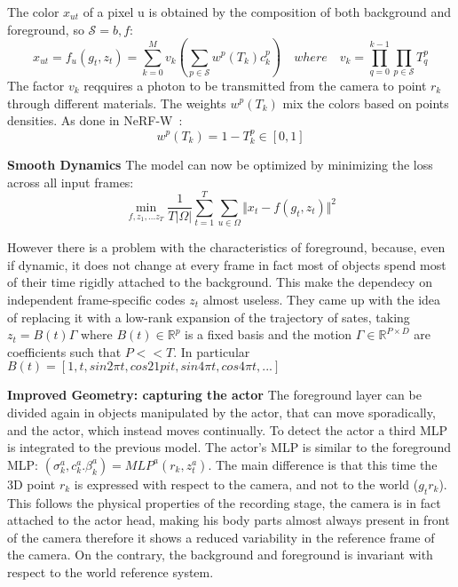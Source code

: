 The color $x_{ut}$ of a pixel u is obtained by the composition of both background and
foreground, so $\mathcal{S} = {b,f}$:
\begin{equation}\label{eq:2}
    x_{ut} = f_{u}(g_t,z_t) = \sum_{k=0}^{M} v_k(\sum_{p \in \mathcal{S}} w^p(T_k)c_k^p)
    \quad where \quad v_k = \prod_{q=0}^{k-1}\prod_{p \in \mathcal{S}} T_q^p
\end{equation}
The factor $v_k$ reqquires a photon to be transmitted from the camera to point $r_k$
through different materials. The weights $w^p(T_k)$ mix the colors based on points densities.
As done in NeRF-W~\cite{nerfw}:
\begin{equation}\label{eq:weights}
    w^p(T_k) = 1 - T_k^p \in [0,1]
\end{equation}

\textbf{Smooth Dynamics} The model can now be optimized by minimizing the loss across
all input frames:
\begin{equation}\label{eq:timeNdiff}
    \min_{f,z_1,...z_T} \frac{1}{T |\Omega|} \sum_{t=1}^{T} \sum_{u\in\Omega}\Vert x_t-f(g_t,z_t)\Vert^2 
\end{equation}

However there is a problem with the characteristics of foreground, because, even if 
dynamic, it does not change at every frame in fact most of objects spend most of 
their time rigidly attached to the background. This make the dependecy on independent
frame-specific codes $z_t$ almost useless. They came up with the idea of 
replacing it with a low-rank expansion of the trajectory of sates, taking 
$z_t = B(t) \Gamma$ where $B(t) \in \mathbb{R}^p$ is a fixed basis and the motion
$\Gamma \in \mathbb{R}^{P \times D}$ are coefficients such that $P << T$.
In particular $B(t)=[1,t,sin 2 \pi t, cos 2 1pi t, sin 4 \pi t, cos 4 \pi t,...]$

\textbf{Improved Geometry: capturing the actor}
The foreground layer can be divided again in objects manipulated by the actor,
 that can move sporadically, and the actor, which instead moves continually.
 To detect the actor a third MLP is integrated to the previous model.
 The actor's MLP is similar to the foreground MLP: $(\sigma_k^a,c_k^a.\beta_k^a) = MLP^a(r_k,z_t^a)$.
 The main difference is that this time the 3D point $r_k$ is expressed with respect 
 to the camera, and not to the world ($g_t r_k$). This follows the physical properties
 of the recording stage, the camera is in fact attached to the actor head, making his
 body parts almost always present in front of the camera therefore it shows a reduced
 variability in the reference frame of the camera. On the contrary, the background and 
 foreground is invariant with respect to the world reference system.

